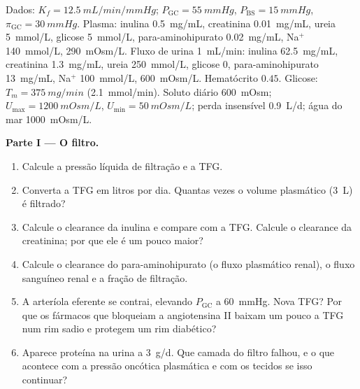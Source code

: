 \begin{problem}
\label{pb:b3:renal-osmoregulation:1}
Dados: $K_{f} = \qty{12.5}{mL/min/mmHg}$; $P_{\text{GC}} = \qty{55}{mmHg}$,
$P_{\text{BS}} = \qty{15}{mmHg}$, $\pi_{\text{GC}} = \qty{30}{mmHg}$.
Plasma: inulina \qty{0.5}{mg/mL}, creatinina \qty{0.01}{mg/mL}, ureia
\qty{5}{mmol/L}, glicose \qty{5}{mmol/L}, para-aminohipurato
\qty{0.02}{mg/mL}, Na$^{+}$ \qty{140}{mmol/L}, 
\qty{290}{mOsm/L}. Fluxo de urina \qty{1}{mL/min}: inulina
\qty{62.5}{mg/mL}, creatinina \qty{1.3}{mg/mL}, ureia \qty{250}{mmol/L},
glicose $0$, para-aminohipurato \qty{13}{mg/mL}, Na$^{+}$
\qty{100}{mmol/L},  \qty{600}{mOsm/L}. Hematócrito $0.45$.
Glicose: $T_{m} =
\qty{375}{mg/min}$ (\qty{2.1}{mmol/min}). Soluto
diário \qty{600}{mOsm}; $U_{\max} = \qty{1200}{mOsm/L}$, $U_{\min} = \qty{50}{mOsm/L}$; perda insensível \qty{0.9}{L/d}; água do mar
\qty{1000}{mOsm/L}.

\medskip
\noindent\textbf{Parte I --- O filtro.}
\begin{enumerate}
  \item Calcule a pressão líquida de filtração e a TFG.
  \item Converta a TFG em litros por dia. Quantas vezes o volume
        plasmático (\qty{3}{L}) é filtrado?
  \item Calcule o clearance da inulina e compare com a TFG. Calcule o
        clearance da creatinina; por que ele é um pouco maior?
  \item Calcule o clearance do para-aminohipurato (o fluxo plasmático
        renal), o fluxo sanguíneo renal e a fração de filtração.
  \item A arteríola eferente se contrai, elevando $P_{\text{GC}}$ a
        \qty{60}{mmHg}. Nova TFG? Por que os fármacos que bloqueiam a
        angiotensina II baixam um pouco a TFG num rim sadio e protegem
        um rim diabético?
  \item Aparece proteína na urina a \qty{3}{g/d}. Que camada do filtro
        falhou, e o que acontece com a pressão oncótica plasmática e com
        os tecidos se isso continuar?
\end{enumerate}


\end{problem}
